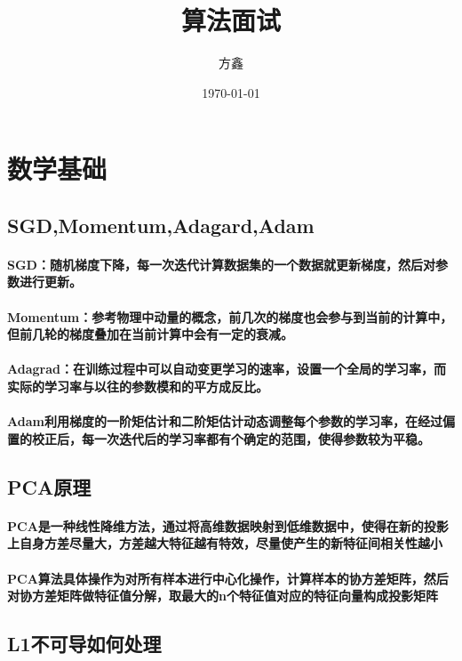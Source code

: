 \documentclass[UTF8]{ctexart}
\title{算法面试}
\author{方鑫}
\date{\today}
\begin{document}
\maketitle
\tableofcontents
\section{数学基础}
\subsection{SGD,Momentum,Adagard,Adam}
\paragraph{SGD：随机梯度下降，每一次迭代计算数据集的一个数据就更新梯度，然后对参数进行更新。}
\paragraph{Momentum：参考物理中动量的概念，前几次的梯度也会参与到当前的计算中，但前几轮的梯度叠加在当前计算中会有一定的衰减。}
\paragraph{Adagrad：在训练过程中可以自动变更学习的速率，设置一个全局的学习率，而实际的学习率与以往的参数模和的平方成反比。}
\paragraph{Adam利用梯度的一阶矩估计和二阶矩估计动态调整每个参数的学习率，在经过偏置的校正后，每一次迭代后的学习率都有个确定的范围，使得参数较为平稳。}

\subsection{PCA原理}
\paragraph{PCA是一种线性降维方法，通过将高维数据映射到低维数据中，使得在新的投影上自身方差尽量大，方差越大特征越有特效，尽量使产生的新特征间相关性越小}
\paragraph{PCA算法具体操作为对所有样本进行中心化操作，计算样本的协方差矩阵，然后对协方差矩阵做特征值分解，取最大的n个特征值对应的特征向量构成投影矩阵}

\subsection{L1不可导如何处理}
\end{document}
